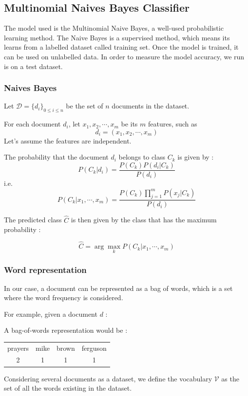 \documentclass[a4paper,12pt]{report}
\begin{document}
\subsection{Multinomial Naives Bayes Classifier}

The model used is the Multinomial Naive Bayes, a well-used probabilistic learning method.
The Naive Bayes is a supervised method, which means its learns from a labelled dataset called training set. Once the model is trained, it can be used on unlabelled data. In order to measure the model accuracy, we run is on a test dataset.

\subsubsection{Naives Bayes}
Let $ \mathcal{D} = \{ d_i \}_{0\leq i\leq n} $ be the set of $n$ documents in the dataset.

For each document $d_i$, let $x_{1},x_{2},\cdots,x_{m}$ be its $m$ features, such as $$d_i = (x_{1},x_{2},\cdots,x_{m})$$
Let's assume the features are independent.

The probability that the document $d_i$ belongs to class $C_k$ is given by :
$$ P(C_k|d_i) = \frac{P(C_k)P(d_i|C_k)}{P(d_i)} $$
i.e. $$ P(C_k|x_{1},\cdots,x_{m}) = \frac{P(C_k)\prod_{j=1}^mP(x_{j}|C_k)}{P(d_i)} $$

The predicted class $\hat{C}$ is then given by the class that has the maximum probability :

$$ \hat{C} = \arg \max_k P(C_k|x_{1},\cdots,x_{m}) $$

\subsubsection{Word representation}

In our case, a document can be represented as a bag of words, which is a set where the word frequency is considered.

For example, given a document $d$ : 

A bag-of-words representation would be :
\begin{center}
\begin{tabular}{|c|c|c|c|}
prayers & mike & brown & ferguson \\
2 & 1 & 1 & 1
\end{tabular}
\end{center}

Considering several documents as a dataset, we define the vocabulary $\mathcal{V}$ as the set of all the words existing in the dataset.
\end{document}
